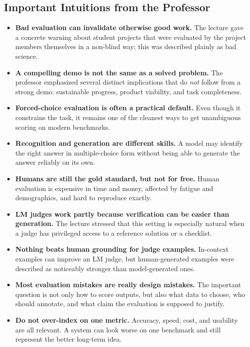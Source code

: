 \documentclass[11pt]{article}
\begin{document}
\subsection{Important Intuitions from the Professor}
\begin{itemize}
    \item \textbf{Bad evaluation can invalidate otherwise good work.} The lecture gave a concrete warning about student projects that were evaluated by the project members themselves in a non-blind way; this was described plainly as bad science.
    \item \textbf{A compelling demo is not the same as a solved problem.} The professor emphasized several distinct implications that do \emph{not} follow from a strong demo: sustainable progress, product viability, and task completeness.
    \item \textbf{Forced-choice evaluation is often a practical default.} Even though it constrains the task, it remains one of the cleanest ways to get unambiguous scoring on modern benchmarks.
    \item \textbf{Recognition and generation are different skills.} A model may identify the right answer in multiple-choice form without being able to generate the answer reliably on its own.
    \item \textbf{Humans are still the gold standard, but not for free.} Human evaluation is expensive in time and money, affected by fatigue and demographics, and hard to reproduce exactly.
    \item \textbf{LM judges work partly because verification can be easier than generation.} The lecture stressed that this setting is especially natural when a judge has privileged access to a reference solution or a checklist.
    \item \textbf{Nothing beats human grounding for judge examples.} In-context examples can improve an LM judge, but human-generated examples were described as noticeably stronger than model-generated ones.
    \item \textbf{Most evaluation mistakes are really design mistakes.} The important question is not only how to score outputs, but also what data to choose, who should annotate, and what claim the evaluation is supposed to justify.
    \item \textbf{Do not over-index on one metric.} Accuracy, speed, cost, and usability are all relevant. A system can look worse on one benchmark and still represent the better long-term idea.
\end{itemize}
\end{document}
